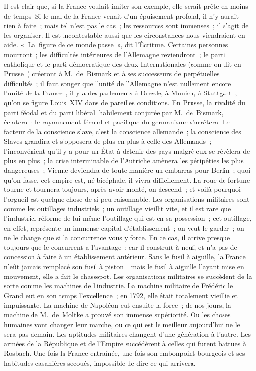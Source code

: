 \documentclass[french,twoside]{book} %
\begin{document}
Il est clair que, si la France voulait imiter son exemple, elle serait prête en moins de temps. Si le mal de la France venait d’un épuisement profond, il n’y aurait rien à faire ; mais tel n’est pas le cas ; les ressources sont immenses ; il s’agit de les organiser. Il est incontestable aussi que les circonstances nous viendraient en aide. « La figure de ce monde passe », dit l’Écriture. Certaines personnes mourront ; les difficultés intérieures de l’Allemagne reviendront ; le parti catholique et le parti démocratique des deux Internationales (comme on dit en Prusse ) créeront à M. de Bismark et à ses successeurs de perpétuelles difficultés ; il faut songer que l’unité de l’Allemagne n’est nullement encore l’unité de la France ; il y a des parlements à Dresde, à Munich, à Stuttgart ; qu’on se figure Louis XIV dans de pareilles conditions. En Prusse, la rivalité du parti féodal et du parti libéral, habilement conjurée par M. de Bismark, éclatera ; le rayonnement fécond et pacifique du germanisme s’arrêtera. Le facteur de la conscience slave, c’est la conscience allemande ; la conscience des Slaves grandira et s’opposera de plus en plus à celle des Allemands ; l’inconvénient qu’il y a pour un État à détenir des pays malgré eux se révèlera de plus en plus ; la crise interminable de l’Autriche amènera les péripéties les plus dangereuses ; Vienne deviendra de toute manière un embarras pour Berlin ; quoi qu’on fasse, cet empire est, né bicéphale, il vivra difficilement. La roue de fortune tourne et tournera toujours, après avoir monté, on descend ; et voilà pourquoi l’orgueil est quelque chose de si peu raisonnable. Les organisations militaires sont comme les outillages industriels ; un outillage vieillit vite, et il est rare que l’industriel réforme de lui-même l’outillage qui est en sa possession ; cet outillage, en effet, représente un immense capital d’établissement ; on veut le garder ; on ne le change que si la concurrence vous y force. En ce cas, il arrive presque toujours que le concurrent a l’avantage ; car il construit à neuf, et n’a pas de concession à faire à un établissement antérieur. Sans le fusil à aiguille, la France n’eût jamais remplacé son fusil à piston ; mais le fusil à aiguille l’ayant mise en mouvement, elle a fait le chassepot. Les organisations militaires se succèdent de la sorte comme les machines de l’industrie. La machine militaire de Frédéric le Grand eut en son temps l’excellence ; en 1792, elle était totalement vieillie et impuissante. La machine de Napoléon eut ensuite la force ; de nos jours, la machine de M. de Moltke a prouvé son immense supériorité. Ou les choses humaines vont changer leur marche, ou ce qui est le meilleur aujourd’hui ne le sera pas demain. Les aptitudes militaires changent d’une génération à l’autre. Les armées de la République et de l’Empire succédèrent à celles qui furent battues à Rosbach. Une fois la France entraînée, une fois son embonpoint bourgeois et ses habitudes casanières secoués, impossible de dire ce qui arrivera.\par
\end{document}
